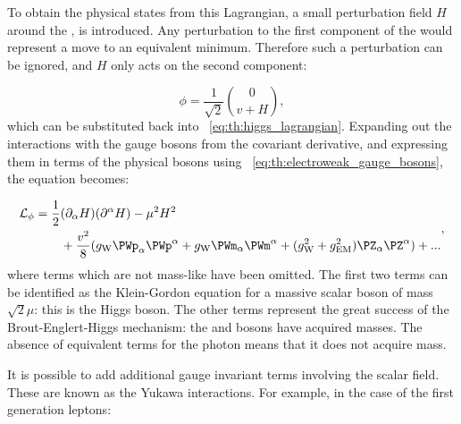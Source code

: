 To obtain the physical states from this Lagrangian, a small perturbation field $H$ around the \VEV, is introduced. Any perturbation to the first component of the \VEV would represent a move to an equivalent minimum. Therefore such a perturbation can be ignored, and $H$ only acts on the second component:

\begin{equation}
\label{eq:th:higgs_vev_perturbation}
\phi = \frac{1}{\sqrt{2}} \binom{0}{v+H} ,
\end{equation}
which can be substituted back into \Eq~\ref{eq:th:higgs_lagrangian}. Expanding out the interactions with the gauge bosons from the covariant derivative, and expressing them in terms of the physical bosons using \Eq~\ref{eq:th:electroweak_gauge_bosons}, the equation becomes:

\begin{equation}
\begin{split}
  \mathcal{L}_{\phi}  =  \frac{1}{2} & (\partial_{\alpha} H) (\partial^{\alpha} H) -  \mu^{2} H^2 \\
&  + \frac{v^2}{8}( g_{\textrm{W}} \PWp_{\alpha}\PWp^{\alpha} + g_{\textrm{W}} \PWm_{\alpha}\PWm^{\alpha} + (g^2_{\textrm{W}}+g^2_{\textrm{EM}}) \PZ_{\alpha}\PZ^{\alpha}) + ...
\end{split},
\end{equation}
\label{eq:th:higgs_lagrangian}
where terms which are not mass-like have been omitted.
The first two terms can be identified as the Klein-Gordon equation for a massive scalar boson of mass $\sqrt{2}\mu$: this is the Higgs boson. The other terms represent the great success of the Brout-Englert-Higgs mechanism: the \PWpm and \PZ bosons have acquired masses. The absence of equivalent terms for the photon means that it does not acquire mass.

It is possible to add additional gauge invariant terms involving the scalar field. These are known as the Yukawa interactions. For example, in the case of the first generation leptons:

